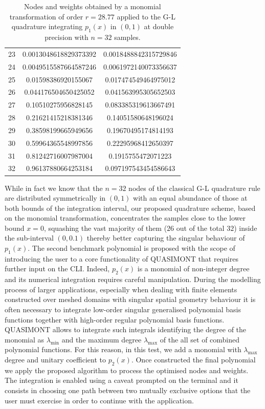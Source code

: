 \documentclass[a4paper, twosided]{book}
\begin{document}
\begin{table}[H]
\begin{tabular}{|c||c|c|}
23  &  0.0013048618829373392   &  0.0018488842315729846   \\
24  &  0.0049515587664587246   &  0.0061972140073356637   \\
25  &  0.01598386920155067     &  0.017474549464975012    \\
26  &  0.044176504650425052    &  0.041563995305652503    \\
27  &  0.10510275956828145     &  0.083385319613667491    \\
28  &  0.21621415218381346     &  0.14051580648196024     \\
29  &  0.38598199665949656     &  0.19670495174814193     \\
30  &  0.59964365548997856     &  0.22295968412650397     \\
31  &  0.81242716007987004     &  0.1915755472071223      \\
32  &  0.96137880664253184     &  0.097197543454586643    \\
\hline
\end{tabular}
  \caption{Nodes and weights obtained by a monomial transformation of order $r=28.77$ applied to the G-L quadrature integrating $p_1(x)$ in $(0,1)$ at double precision with $n=32$ samples.}
  \label{table2.2}
\end{table}

\noindent
While in fact we know that the $n=32$ nodes of the classical G-L quadrature rule are distributed symmetrically in $(0,1)$ with an equal abundance of those at both bounds of the integration interval, our proposed quadrature scheme, based on the monomial transformation, concentrates the samples close to the lower bound $x=0$, squashing the vast majority of them ($26$ out of the total $32$) inside the sub-interval $(0,0.1)$ thereby better capturing the singular behaviour of $p_1(x)$. The second benchmark polynomial is proposed with the scope of introducing the user to a core functionality of QUASIMONT that requires further input on the CLI. Indeed, $p_2(x)$ is a monomial of non-integer degree and its numerical integration requires careful manipulation. During the modelling process of larger applications, especially when dealing with finite elements constructed over meshed domains with singular spatial geometry behaviour \cite{Graglia04,Graglia08} it is often necessary to integrate low-order singular generalised polynomial basis functions together with high-order regular polynomial basis functions. QUASIMONT allows to integrate such integrals identifying the degree of the monomial as $\lambda_{\text{min}}$ and the maximum degree  $\lambda_{\text{max}}$ of the all set of combined polynomial functions. For this reason, in this test, we add a monomial with $\lambda_{\text{max}}$ degree and unitary coefficient to $p_2(x)$. Once constructed the final polynomial we apply the proposed algorithm to process the optimised nodes and weights. The integration is enabled using a caveat prompted on the terminal and it consists in choosing one path between two mutually exclusive options that the user must exercise in order to continue with the application.
\end{document}
